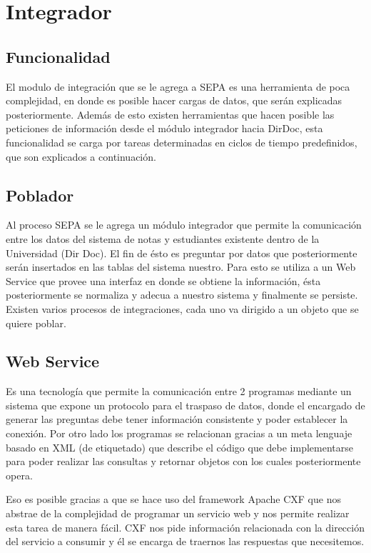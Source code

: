\documentclass[a4paper,12pt,openany,oneside]{book}
\begin{document}
\chapter{Integrador}
\thispagestyle{empty}
\section{Funcionalidad}

El modulo de integración que se le agrega a SEPA es una herramienta de poca complejidad, en donde es posible hacer cargas de datos, que serán explicadas posteriormente. Además de esto existen herramientas que hacen posible las peticiones de información desde el módulo integrador hacia DirDoc, esta funcionalidad se carga por tareas determinadas en ciclos de tiempo predefinidos, que son explicados a continuación.

\section{Poblador}
Al proceso SEPA se le agrega un módulo integrador que permite la comunicación entre los datos del sistema de notas y estudiantes existente dentro de la Universidad (Dir Doc). El fin de ésto es preguntar por datos que posteriormente serán insertados en las tablas del sistema nuestro. Para esto se utiliza a un Web Service que provee una interfaz en donde se obtiene la información, ésta posteriormente se normaliza y adecua a nuestro sistema y finalmente se persiste. Existen varios procesos de integraciones, cada uno va dirigido a un objeto que se quiere poblar.
\section{Web Service}
Es una tecnología que permite la comunicación entre 2 programas mediante un sistema que expone un protocolo para el traspaso de datos, donde el encargado de generar las preguntas debe tener información consistente y poder establecer la conexión. Por otro lado los programas se relacionan gracias a un meta lenguaje basado en XML (de etiquetado) que describe el código que debe implementarse para poder realizar las consultas y retornar objetos con los cuales posteriormente opera.

Eso es posible gracias a que se hace uso del framework Apache CXF que nos abstrae de la complejidad de programar un servicio web y nos permite realizar esta tarea de manera fácil. CXF nos pide información relacionada con la dirección del servicio a consumir y él se encarga de traernos las respuestas que necesitemos.
\end{document}
